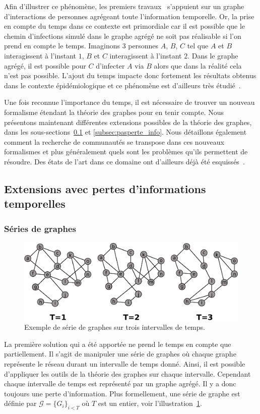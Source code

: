 Afin d'illustrer ce phénomène, les premiers travaux~\cite{Vespignani2008}
s'appuient sur un graphe d'interactions de personnes agrégeant toute l'information temporelle.
Or, la prise en compte du temps dans ce contexte est primordiale car il est possible que le chemin d'infections simulé dans le graphe agrégé ne soit pas réalisable si l'on prend en compte le temps.
Imaginons 3 personnes $A$, $B$, $C$ tel que $A$ et $B$ interagissent à l'instant $1$, $B$ et $C$ interagissent à l'instant $2$.
Dans le graphe agrégé, il est possible pour $C$ d'infecter $A$ via $B$ alors que dans la réalité cela n'est pas possible.
L'ajout du temps impacte donc fortement les résultats obtenus dans le contexte épidémiologique et ce phénomène est d'ailleurs très étudié~\cite{Gauvin2015a,Karsai2011,Jo2014,Horvath2014,Holme2014a,Scholtes2014,Perotti2014a}.

Une fois reconnue l'importance du temps, il est nécessaire de trouver un nouveau formalisme étendant la théorie des graphes pour en tenir compte.
Nous présentons maintenant différentes extensions possibles de la théorie des graphes, dans les sous-sections~\ref{subsec:perte_info} et \ref{subsec:pasperte_info}.
Nous détaillons également comment la recherche de communautés se transpose dans ces nouveaux formalismes et plus généralement quels sont les problèmes qu'ils permettent de résoudre.
Des états de l'art dans ce domaine ont d'ailleurs déjà été esquissés~\cite{Boccaletti2014,Cazabet2014,hartmann2014clustering}.

\subsection{Extensions avec pertes d'informations temporelles}
\label{subsec:perte_info}
\subsubsection{Séries de graphes}
\begin{figure}[h]
\centering
\includegraphics[width=0.8\linewidth]{img/Intro/TVG.eps}
\caption{Exemple de série de graphes sur trois intervalles de temps.}
\label{fig:exemple_TVG}
\end{figure}
La première solution qui a été apportée ne prend le temps en compte que partiellement.
Il s'agit de manipuler une série de graphes où chaque graphe représente le réseau durant un intervalle de temps donné.
Ainsi, il est possible d'appliquer les outils de la théorie des graphes sur chaque intervalle.
Cependant chaque intervalle de temps est représenté par un graphe agrégé.
Il y a donc toujours une perte d'information.
Plus formellement, une série de graphe est définie par $\mathcal{G}=\{G_i\}_{i < T}$ où $T$ est un entier, voir l'illustration~\ref{fig:exemple_TVG}.

